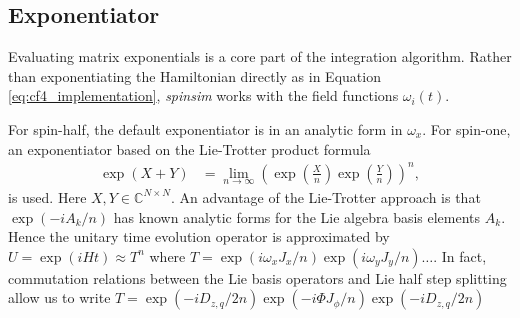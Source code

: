 \documentclass{jors}
\begin{document}
	\subsection{Exponentiator}
		Evaluating matrix exponentials is a core part of the integration algorithm.
		Rather than exponentiating the Hamiltonian directly as in Equation \eqref{eq:cf4_implementation}, \emph{spinsim} works with the field functions \(\omega_i(t)\).

		For spin-half, the default exponentiator is in an analytic form in \(\omega_x\).%
		For spin-one, an exponentiator based on the Lie-Trotter product formula\cite{moler_nineteen_2003}
		\begin{align}
			\exp\left( X + Y\right) &= \lim_{n\to\infty} \left(\exp\left(\frac{X}{n}\right) \exp\left(\frac{Y}{n}\right)\right)^n,\label{eq:lie_trotter}
		\end{align}
		is used.
		Here \(X,Y\in\mathbb{C}^{N\times N}\).
		An advantage of the Lie-Trotter approach is that \(\exp(-iA_k/n)\) has known analytic forms for the Lie algebra basis elements \(A_k\).
		Hence the unitary time evolution operator is approximated by \( U = \exp(iHt) \approx T^n \) where \( T= \exp(i \omega_x J_x / n) \exp(i \omega_y J_y / n) \dots \).
		In fact, commutation relations between the Lie basis operators and Lie half step splitting allow us to write \(T = \exp(-iD_{z,q}/2n)\exp(-i\Phi J_\phi/n)\exp(-iD_{z,q}/2n)\) %
\end{document}
